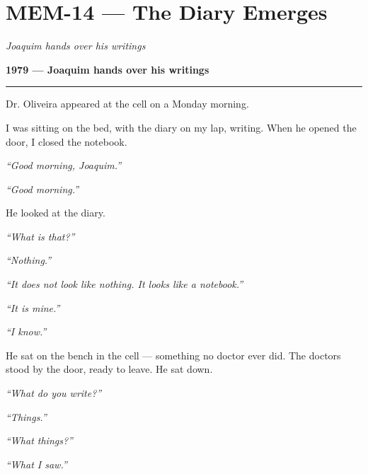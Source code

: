 \section*{\textbf{MEM-14} --- The Diary Emerges}

\noindent \textit{Joaquim hands over his writings}

\noindent \textbf{1979 --- Joaquim hands over his writings}

\vspace{0.5em}\noindent\rule{\textwidth}{0.5pt}\vspace{0.5em}

\noindent Dr. Oliveira appeared at the cell on a Monday morning.

\noindent I was sitting on the bed, with the diary on my lap, writing. When he opened the door, I closed the notebook.

\noindent \textit{\textquotedblleft{}Good morning, Joaquim.\textquotedblright{}}

\noindent \textit{\textquotedblleft{}Good morning.\textquotedblright{}}

\noindent He looked at the diary.

\noindent \textit{\textquotedblleft{}What is that?\textquotedblright{}}

\noindent \textit{\textquotedblleft{}Nothing.\textquotedblright{}}

\noindent \textit{\textquotedblleft{}It does not look like nothing. It looks like a notebook.\textquotedblright{}}

\noindent \textit{\textquotedblleft{}It is mine.\textquotedblright{}}

\noindent \textit{\textquotedblleft{}I know.\textquotedblright{}}

\noindent He sat on the bench in the cell --- something no doctor ever did. The doctors stood by the door, ready to leave. He sat down.

\noindent \textit{\textquotedblleft{}What do you write?\textquotedblright{}}

\noindent \textit{\textquotedblleft{}Things.\textquotedblright{}}

\noindent \textit{\textquotedblleft{}What things?\textquotedblright{}}

\noindent \textit{\textquotedblleft{}What I saw.\textquotedblright{}}

